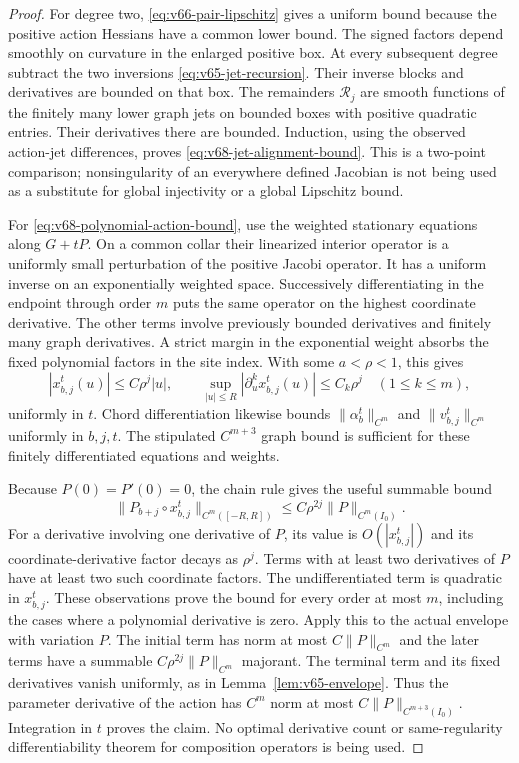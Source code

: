 \begin{proof}
For degree two, \eqref{eq:v66-pair-lipschitz} gives a uniform bound
because the positive action Hessians have a common lower bound.
The signed factors depend smoothly on curvature in the enlarged
positive box.  At every subsequent degree subtract the two inversions
\eqref{eq:v65-jet-recursion}.  Their inverse blocks and derivatives
are bounded on that box.  The remainders $\mathcal R_j$ are smooth
functions of the finitely many lower graph jets on bounded boxes with
positive quadratic entries.  Their derivatives there are bounded.
Induction, using the observed action-jet differences, proves
\eqref{eq:v68-jet-alignment-bound}.  This is a two-point comparison;
nonsingularity of an everywhere defined Jacobian is not being used as
a substitute for global injectivity or a global Lipschitz bound.

For \eqref{eq:v68-polynomial-action-bound}, use the weighted
stationary equations along $G+tP$.  On a common collar their
linearized interior operator is a uniformly small perturbation of the
positive Jacobi operator.  It has a uniform inverse on an exponentially
weighted space.  Successively differentiating in the endpoint through
order $m$ puts the same operator on the highest coordinate derivative.
The other terms involve previously bounded derivatives and finitely
many graph derivatives.  A strict margin in the exponential weight
absorbs the fixed polynomial factors in the site index.  With some
$a<\rho<1$, this gives
\[
 |x^t_{b,j}(u)|\le C\rho^j|u|,\qquad
 \sup_{|u|\le R}|\partial_u^k x^t_{b,j}(u)|
                  \le C_k\rho^j\quad(1\le k\le m),
\]
uniformly in $t$.  Chord differentiation likewise bounds
$\|\alpha_b^t\|_{C^m}$ and $\|v_{b,j}^t\|_{C^m}$ uniformly
in $b,j,t$.  The stipulated $C^{m+3}$ graph bound is sufficient for
these finitely differentiated equations and weights.

Because $P(0)=P'(0)=0$, the chain rule gives the useful summable bound
\[
 \|P_{b+j}\circ x^t_{b,j}\|_{C^m([-R,R])}
                  \le C\rho^{2j}\|P\|_{C^m(I_0)}.
\]
For a derivative involving one derivative of $P$, its value is
$O(|x^t_{b,j}|)$ and its coordinate-derivative factor decays as
$\rho^j$.  Terms with at least two derivatives of $P$ have at least
two such coordinate factors.  The undifferentiated term is quadratic
in $x^t_{b,j}$.  These observations prove the bound for every order
at most $m$, including the cases where a polynomial derivative is zero.
Apply this to the actual envelope with variation $P$.  The initial
term has norm at most $C\|P\|_{C^m}$ and the later terms have a
summable $C\rho^{2j}\|P\|_{C^m}$ majorant.  The terminal term
and its fixed derivatives vanish uniformly, as in
Lemma~\ref{lem:v65-envelope}.  Thus the parameter derivative of
the action has $C^m$ norm at most $C\|P\|_{C^{m+3}(I_0)}$.
Integration in $t$ proves the claim.  No optimal derivative count or
same-regularity differentiability theorem for composition operators is
being used.
\end{proof}

